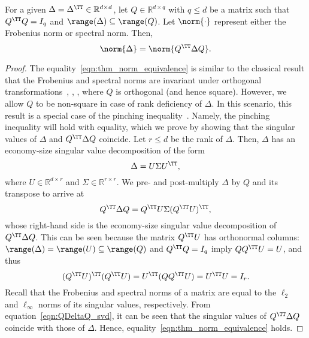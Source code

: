 \begin{lem}\label{lem:norm}
	For a given $\Delta=\Delta^\TT\in\mathbb{R}^{d \times d}$,
	let $Q \in \mathbb{R}^{d \times q}$ with $q \leq d$ be a matrix such that $Q^\TT Q = I_q$ and $\range(\Delta) \subseteq \range(Q)$.
Let $\norm{ \cdot }$ represent either the Frobenius norm or spectral norm.
Then,
\begin{equation}
	\norm{ \Delta } = \norm{ Q^\TT \Delta Q }.
	\label{eqn:thm_norm_equivalence}
\end{equation}
\end{lem}
\begin{proof}
The equality~\eqref{eqn:thm_norm_equivalence} is similar to the classical result that the Frobenius and spectral norms are invariant under orthogonal transformations~\cite[Section~IV.2]{bhatia2013matrix}, \cite[Section~7.4.7]{horn2012matrix}, \cite[Section~6.2]{higham2002accuracy}, where $Q$ is orthogonal (and hence square). %
However, we allow $Q$ to be non-square in case of rank deficiency of $\Delta$.
In this scenario, this result is a special case of the pinching inequality~\cite[Theorem~2.7]{bhatia1987unitary}.
Namely, the pinching inequality will hold with equality, which we prove by showing that the singular values of $\Delta$ and $Q^\TT \Delta Q$ coincide.
Let $r \leq d$ be the rank of $\Delta$.
Then, $\Delta$ has an economy-size singular value decomposition of the form
\begin{equation}
	\Delta = U \Sigma U^\TT,
	\label{eqn:Delta_svd}
\end{equation}
where $U \in \mathbb{R}^{d \times r}$ and $\Sigma \in \mathbb{R}^{r \times r}$.
We pre- and post-multiply $\Delta$ by $Q$ and its transpose to arrive at
\begin{equation}
	Q^\TT \Delta Q = Q^\TT U \Sigma (Q^\TT U)^\TT,
	\label{eqn:QDeltaQ_svd}
\end{equation}
whose right-hand side is the economy-size singular value decomposition of $Q^\TT \Delta Q$.
This can be seen because the matrix $Q^\TT U$ has orthonormal columns:
$\range(\Delta) = \range(U) \subseteq \range(Q)$ and $Q^\TT Q = I_q$ imply $Q Q^\TT U = U$,
and thus
\begin{equation}
	(Q^\TT U)^\TT (Q^\TT U) = U^\TT (Q Q^\TT U) = U^\TT U = I_r
	.
\end{equation}
Recall that the Frobenius and spectral norms of a matrix are equal to the $\ell_2$ and $\ell_\infty$ norms of its singular values, respectively.
From equation~\eqref{eqn:QDeltaQ_svd}, it can be seen that the singular values of $Q^\TT \Delta Q$ coincide with those of $\Delta$.
Hence, equality~\eqref{eqn:thm_norm_equivalence} holds.
\end{proof}

